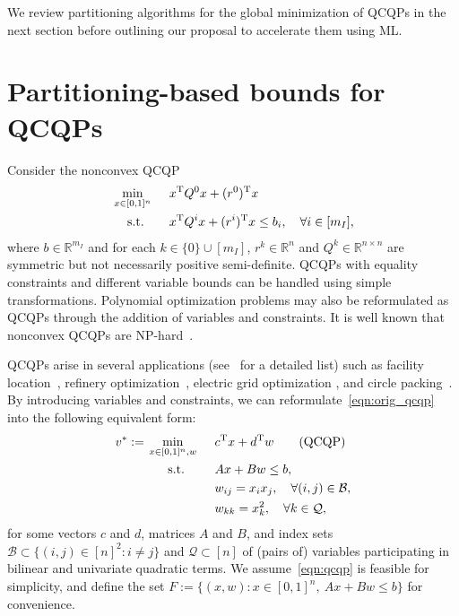 \documentclass{article}
\newcommand{\R}{\mathbb{R}}
\begin{document}
We review partitioning algorithms for the global minimization of QCQPs in the next section before outlining our proposal to accelerate them using ML.








\section{Partitioning-based bounds for QCQPs}
\label{sec:partitioning_bounds}


Consider the nonconvex QCQP
\begin{alignat}{2}
\label{eqn:orig_qcqp}
&\min_{x \in [0,1]^{n}} \:\: && x^{\textup{T}} Q^0 x + (r^0)^{\textup{T}} x \\
&\quad\: \text{s.t.} && x^{\textup{T}} Q^i x + (r^i)^{\textup{T}} x \leq b_i, \quad \forall i \in [m_I], \nonumber
\end{alignat}
where $b \in \R^{m_I}$ and for each $k \in \{0\} \cup [m_I]$, $r^k \in \R^n$ and $Q^k \in \R^{n \times n}$ are symmetric but not necessarily positive semi-definite.
QCQPs with equality constraints and different variable bounds can be handled using simple transformations.
Polynomial optimization problems may also be reformulated as QCQPs through the addition of variables and constraints.
It is well known that nonconvex QCQPs are NP-hard~\cite{vavasis1990quadratic}. 

QCQPs arise in several applications (see~\cite{misener2013glomiqo} for a detailed list) such as facility location~\cite{koopmans1957assignment}, refinery optimization~\cite{kannan2018algorithms,yang2016integrated}, electric grid optimization \cite{bienstock2022mathematical}, and circle packing~\cite{costa2013impact}.
By introducing variables and constraints, we can reformulate~\eqref{eqn:orig_qcqp} into the following equivalent form:
\begin{alignat}{2}
\label{eqn:qcqp}
v^* := \: &\min_{x \in [0,1]^n, w} \:\: && c^{\textup{T}} x + d^{\textup{T}} w \tag{QCQP} \\
&\quad\:\:\: \text{s.t.} && A x + B w \leq b, \nonumber\\
& && w_{ij} = x_i x_j, \quad \forall (i, j) \in \mathcal{B}, \nonumber\\
& && w_{kk} = x^2_k, \quad \forall k \in \mathcal{Q}, \nonumber
\end{alignat}
for some vectors $c$ and $d$, matrices $A$ and $B$, and index sets $\mathcal{B} \subset \{(i,j) \in [n]^2 : i \neq j \}$ and $\mathcal{Q} \subset [n]$ of (pairs of) variables participating in bilinear and univariate quadratic terms.
We assume~\eqref{eqn:qcqp} is feasible for simplicity, and define the set $F := \{(x,w) : x \in [0,1]^n, \: Ax + Bw \leq b\}$ for convenience.
\end{document}
